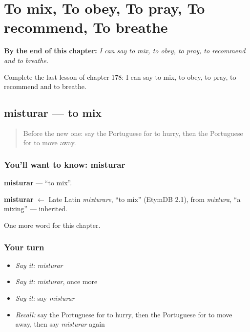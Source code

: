 
\chapter{To mix, To obey, To pray, To recommend, To breathe}
\label{ch:pt-to-mix-to-obey-to-pray-to-recommend-to-breathe}

\begin{chapteropening}
\textbf{By the end of this chapter:} \emph{I can say to mix, to obey, to pray, to recommend and to breathe.}

Complete the last lesson of chapter 178: I can say to mix, to obey, to pray, to recommend and to breathe.
\end{chapteropening}

\section[misturar]{misturar — to mix}

\label{lesson:PT-C178-misturar}



\begin{quote}
Before the new one: say the Portuguese for to hurry, then the Portuguese for to move away.
\end{quote}

\subsection*{You'll want to know: misturar}
\textbf{misturar} — \textquotedblleft{}to mix\textquotedblright{}.

\begin{cousinweb}
\textbf{misturar} $\leftarrow$ Late Latin \emph{mixturare}, \textquotedblleft{}to mix\textquotedblright{} (EtymDB 2.1), from \emph{mixtura}, \textquotedblleft{}a mixing\textquotedblright{} — inherited.
\end{cousinweb}

\begin{grammarlens}[title={What you've built}]
One more word for this chapter.
\end{grammarlens}

\subsection*{Your turn}
\begin{itemize}
\raggedright
  \item \emph{Say it:} \emph{misturar}
  \item \emph{Say it:} \emph{misturar}, once more
  \item \emph{Say it:} say \emph{misturar}
  \item \emph{Recall:} say the Portuguese for to hurry, then the Portuguese for to move away, then say \emph{misturar} again
\end{itemize}

